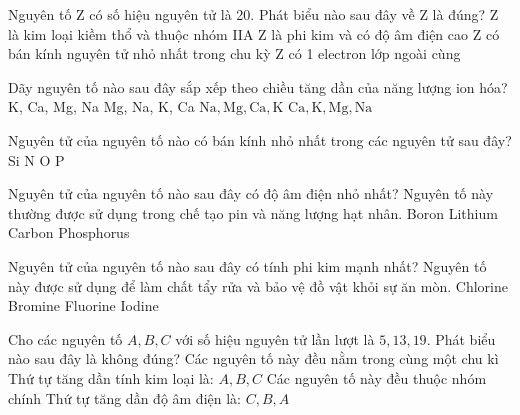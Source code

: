 \begin{ex}%
	Nguyên tố Z có số hiệu nguyên tử là 20. Phát biểu nào sau đây về Z là đúng?
	\choice
	{\True Z là kim loại kiềm thổ và thuộc nhóm IIA}
	{Z là phi kim và có độ âm điện cao}
	{Z có bán kính nguyên tử nhỏ nhất trong chu kỳ}
	{Z có 1 electron lớp ngoài cùng}
\end{ex}
\begin{ex}%
	Dãy nguyên tố nào sau đây sắp xếp theo chiều tăng dần của năng lượng ion hóa?
	\choice
	{K, Ca, Mg, Na}
	{Mg, Na, K, Ca}
	{\True $\mathrm{Na}, \mathrm{Mg}, \mathrm{Ca}, \mathrm{K}$}
	{$\mathrm{Ca}, \mathrm{K}, \mathrm{Mg}, \mathrm{Na}$}
\end{ex}
\begin{ex}%
	Nguyên tử của nguyên tố nào có bán kính nhỏ nhất trong các nguyên tử sau đây?
	\choice
	{Si}
	{N}
	{\True O}
	{P}
\end{ex}

\begin{ex}%
	Nguyên tử của nguyên tố nào sau đây có độ âm điện nhỏ nhất? Nguyên tố này thường được sử dụng trong chế tạo pin và năng lượng hạt nhân.
	\choice
	{Boron}
	{\True Lithium}
	{Carbon}
	{Phosphorus}
\end{ex}

\begin{ex}%
	Nguyên tử của nguyên tố nào sau đây có tính phi kim mạnh nhất? Nguyên tố này được sử dụng để làm chất tẩy rửa và bảo vệ đồ vật khỏi sự ăn mòn.
	\choice
	{Chlorine}
	{Bromine}
	{\True Fluorine}
	{Iodine}
\end{ex}
\begin{ex}%
	Cho các nguyên tố $A, B, C$ với số hiệu nguyên tử lần lượt là $5, 13, 19$. Phát biểu nào sau đây là không  đúng?
	\choice
	{\True Các nguyên tố này đều nằm trong cùng một chu kì}
	{ Thứ tự tăng dần tính kim loại là: $A, B, C$}
	{Các nguyên tố này đều thuộc nhóm chính}
	{Thứ tự tăng dần độ âm điện là: $C, B, A$}
\end{ex}


